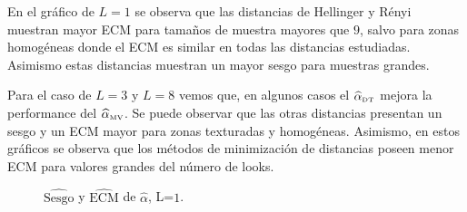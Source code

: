  En el gráfico de $L=1$ se observa que las distancias de Hellinger y Rényi muestran mayor ECM para tamaños de muestra mayores que $9$, salvo para zonas homogéneas donde el ECM es similar en todas las distancias estudiadas. Asimismo estas distancias muestran un mayor sesgo para muestras grandes.

Para el caso de $L=3$ y $L=8$ vemos que, en algunos casos el $\widehat{\alpha}_{\text{\tiny{DT}}}$ mejora la performance del $\widehat{\alpha}_{\text{\tiny{MV}}}$. Se puede observar que las otras distancias presentan un sesgo y un ECM mayor para zonas texturadas y homogéneas. Asimismo, en estos gráficos se observa que los métodos de minimización de distancias poseen menor ECM para valores grandes del número de looks. 

\begin{figure}[htb]
	\centering    
	\caption{\small $\widehat{\text{Sesgo}}$ y $\widehat{\text{ECM}}$ de $\widehat{\alpha}$, L=$1$.}
\end{figure}	
